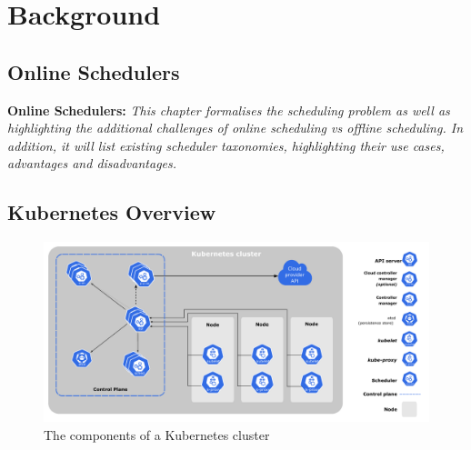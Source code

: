 \chapter{Background}
%
%

\section{Online Schedulers}
\begin{tcolorbox}[boxsep=0mm,left=2.5mm,right=2.5mm] \textbf{Online Schedulers:}
{\em This chapter formalises the scheduling problem as well as highlighting the
additional challenges of online scheduling vs offline scheduling. In addition,
it will list existing scheduler taxonomies, highlighting their use cases,
advantages and disadvantages.}  \end{tcolorbox}

\section{Kubernetes Overview}

\begin{figure}[h]
    \centering
    \includegraphics[width=\textwidth]{images/components-of-kubernetes.pdf}
    \caption{The components of a Kubernetes cluster}
    \label{kube-components}
\end{figure}

